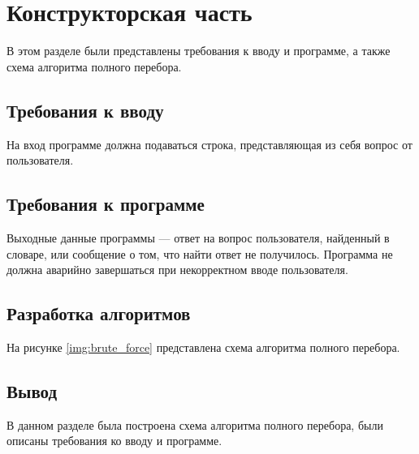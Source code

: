 \chapter{Конструкторская часть}
В этом разделе были представлены требования к вводу и программе, а также схема алгоритма полного перебора.

\section{Требования к вводу}
На вход программе должна подаваться строка, представляющая из себя вопрос от пользователя.

\section{Требования к программе}
Выходные данные программы --- ответ на вопрос пользователя, найденный в словаре, или сообщение о том, что найти ответ не получилось. Программа не должна аварийно завершаться при некорректном вводе пользователя.

\section{Разработка алгоритмов}

На рисунке \ref{img:brute_force} представлена схема алгоритма полного перебора.


\clearpage

\section*{Вывод}

В данном разделе была построена схема алгоритма полного перебора, были описаны требования ко вводу и программе.